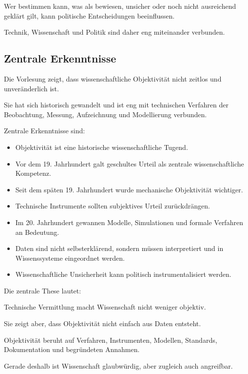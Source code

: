 Wer bestimmen kann,
was als bewiesen,
unsicher
oder noch nicht ausreichend geklärt gilt,
kann politische Entscheidungen beeinflussen.

Technik,
Wissenschaft
und Politik sind daher eng miteinander verbunden.

\subsection{Zentrale Erkenntnisse}

Die Vorlesung zeigt,
dass wissenschaftliche Objektivität
nicht zeitlos und unveränderlich ist.

Sie hat sich historisch gewandelt
und ist eng mit technischen Verfahren
der Beobachtung,
Messung,
Aufzeichnung
und Modellierung verbunden.

Zentrale Erkenntnisse sind:

\begin{itemize}
\item Objektivität ist eine historische wissenschaftliche Tugend.
\item Vor dem 19. Jahrhundert galt geschultes Urteil als zentrale wissenschaftliche Kompetenz.
\item Seit dem späten 19. Jahrhundert wurde mechanische Objektivität wichtiger.
\item Technische Instrumente sollten subjektives Urteil zurückdrängen.
\item Im 20. Jahrhundert gewannen Modelle, Simulationen und formale Verfahren an Bedeutung.
\item Daten sind nicht selbsterklärend, sondern müssen interpretiert und in Wissenssysteme eingeordnet werden.
\item Wissenschaftliche Unsicherheit kann politisch instrumentalisiert werden.
\end{itemize}

Die zentrale These lautet:

Technische Vermittlung macht Wissenschaft nicht weniger objektiv.

Sie zeigt aber,
dass Objektivität nicht einfach aus Daten entsteht.

Objektivität beruht auf Verfahren,
Instrumenten,
Modellen,
Standards,
Dokumentation
und begründeten Annahmen.

Gerade deshalb ist Wissenschaft glaubwürdig,
aber zugleich auch angreifbar.
